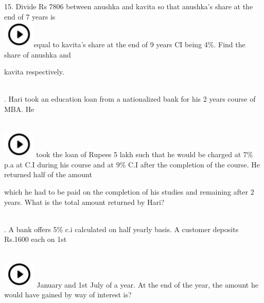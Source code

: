 \documentclass{article}
\begin{document}
	15. Divide Rs 7806 between anushka and kavita so that anushka's share at the end of 7 years is \noindent \\ \includegraphics*[width=0.60in, height=0.52in]{images/image1}equal to kavita's share at the end of 9 years CI being 4\%. Find the share of anushka and
	
	\noindent kavita respectively.
	
	\noindent 
	
	\noindent  \\  
	
	. Hari took an education loan from a nationalized bank for his 2 years course of MBA. He
	
	\noindent \noindent \\ \includegraphics*[width=0.60in, height=0.52in]{images/image1} took the loan of Rupees 5 lakh such that he would be charged at 7\% p.a at C.I during his course  and at 9\% C.I after the completion of the course. He returned half of the amount
	
	\noindent 
	
	\noindent which he had to be paid on the completion of his studies and remaining after 2 years. What is the total amount returned by Hari?
	
	\noindent 
	
	\noindent  \\  
	
	. A bank offers 5\% c.i calculated on half yearly basis. A customer deposits Rs.1600 each on 1st
	
	\noindent \noindent \\ \includegraphics*[width=0.61in, height=0.52in]{images/image1} January and 1st July of a year. At the end of the year, the amount he would have gained by way of interest is?
	
	\noindent 
	
	\noindent 
	
	\noindent  \\  
	
\end{document}

